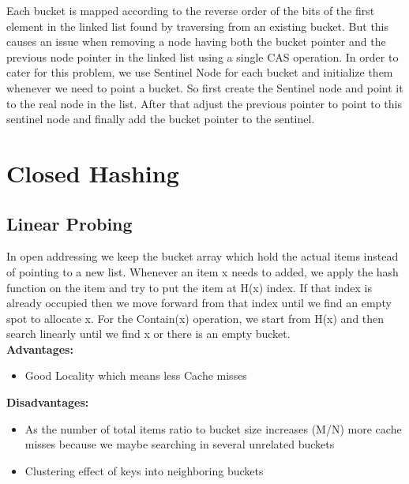 \documentclass[twoside]{article}
\begin{document}
Each bucket is mapped according to the reverse order of the bits of the first element in the linked list found by traversing from an existing bucket. But this causes an issue when removing a node having both the bucket pointer and the previous node pointer in the linked list using a single CAS operation. In order to cater for this problem, we use Sentinel Node for each bucket and initialize them whenever we need to point a bucket. So first create the Sentinel node and point it to the real node in the list. After that adjust the previous pointer to point to this sentinel node and finally add the bucket pointer to the sentinel.  

\section{Closed Hashing}

\subsection{Linear Probing}
In open addressing we keep the bucket array which hold the actual items instead of pointing to a new list. Whenever an item x needs to added, we apply the hash function on the item and try to put the item at H(x) index. If that index is already occupied then we move forward from that index until we find an empty spot to allocate x. For the Contain(x) operation, we start from H(x) and then search linearly until we find x or there is an empty bucket.\\
\textbf{Advantages:}
\begin{itemize}
\item Good Locality which means less Cache misses 
\end{itemize}
\textbf{Disadvantages:}
\begin{itemize}
\item As the number of total items ratio to bucket size increases (M/N) more cache misses because we maybe searching in several unrelated buckets
\item Clustering effect of keys into neighboring buckets 
\end{itemize}
\end{document}
